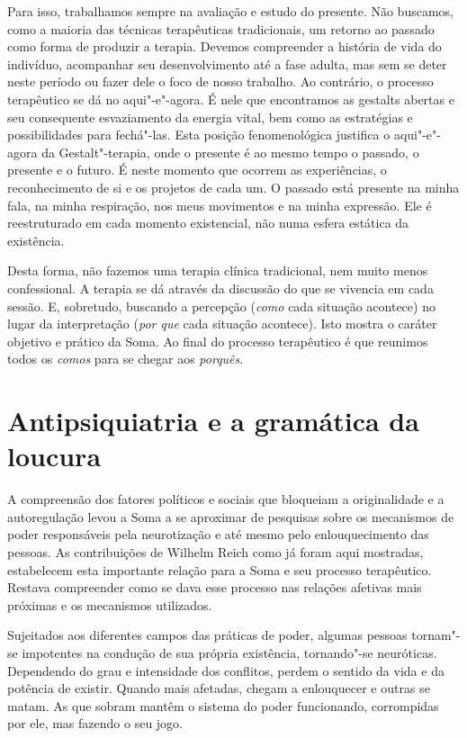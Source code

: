 Para isso, trabalhamos sempre na avaliação e estudo do presente. Não
buscamos, como a maioria das técnicas terapêuticas tradicionais, um
retorno ao passado como forma de produzir a terapia. Devemos compreender
a história de vida do indivíduo, acompanhar seu desenvolvimento até a
fase adulta, mas sem se deter neste período ou fazer dele o foco de
nosso trabalho. Ao contrário, o processo terapêutico se dá no
aqui"-e"-agora. É nele que encontramos as gestalts abertas e seu
consequente esvaziamento da energia vital, bem como as estratégias e
possibilidades para fechá"-las. Esta posição fenomenológica justifica o
aqui"-e"-agora da Gestalt"-terapia, onde o presente é ao mesmo tempo o
passado, o presente e o futuro. É neste momento que ocorrem as
experiências, o reconhecimento de si e os projetos de cada um. O passado
está presente na minha fala, na minha respiração, nos meus movimentos e
na minha expressão. Ele é reestruturado em cada momento existencial, não
numa esfera estática da existência.

Desta forma, não fazemos uma terapia clínica tradicional, nem muito
menos confessional. A terapia se dá através da discussão do que se
vivencia em cada sessão. E, sobretudo, buscando a percepção (\emph{como}
cada situação acontece) no lugar da interpretação (\emph{por que} cada
situação acontece). Isto mostra o caráter objetivo e prático da Soma. Ao
final do processo terapêutico é que reunimos todos os \emph{comos} para
se chegar aos \emph{porquês}.

\section{Antipsiquiatria e a gramática da loucura}

A compreensão dos fatores políticos e sociais que bloqueiam a
originalidade e a autoregulação levou a Soma a se aproximar de pesquisas
sobre os mecanismos de poder responsáveis pela neurotização e até mesmo
pelo enlouquecimento das pessoas. As contribuições de Wilhelm Reich como
já foram aqui mostradas, estabelecem esta importante relação para a Soma
e seu processo terapêutico. Restava compreender como se dava esse
processo nas relações afetivas mais próximas e os mecanismos utilizados.

Sujeitados aos diferentes campos das práticas de poder, algumas pessoas
tornam"-se impotentes na condução de sua própria existência, tornando"-se
neuróticas. Dependendo do grau e intensidade dos conflitos, perdem o
sentido da vida e da potência de existir. Quando mais afetadas, chegam a
enlouquecer e outras se matam. As que sobram mantêm o sistema do poder
funcionando, corrompidas por ele, mas fazendo o seu jogo.

